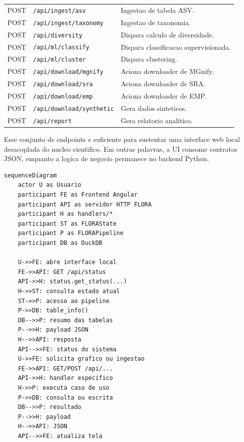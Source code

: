 \documentclass[12pt,a4paper]{article}
\begin{document}
\begin{longtable}{>{\raggedright\arraybackslash}p{2.2cm} >{\raggedright\arraybackslash}p{4.2cm} >{\raggedright\arraybackslash}p{7.4cm}}
    POST & \texttt{/api/ingest/asv} & Ingestao de tabela ASV. \\
    POST & \texttt{/api/ingest/taxonomy} & Ingestao de taxonomia. \\
    POST & \texttt{/api/diversity} & Dispara calculo de diversidade. \\
    POST & \texttt{/api/ml/classify} & Dispara classificacao supervisionada. \\
    POST & \texttt{/api/ml/cluster} & Dispara clustering. \\
    POST & \texttt{/api/download/mgnify} & Aciona downloader de MGnify. \\
    POST & \texttt{/api/download/sra} & Aciona downloader de SRA. \\
    POST & \texttt{/api/download/emp} & Aciona downloader de EMP. \\
    POST & \texttt{/api/download/synthetic} & Gera dados sinteticos. \\
    POST & \texttt{/api/report} & Gera relatorio analitico. \\
    \bottomrule
\end{longtable}

Esse conjunto de endpoints e suficiente para sustentar uma interface web local desacoplada do nucleo cientifico. Em outras palavras, a UI consome contratos JSON, enquanto a logica de negocio permanece no backend Python.

\begin{lstlisting}[style=mermaid,caption={Diagrama Mermaid da interacao entre frontend SPA e backend local.},label={lst:mermaid_ui_backend}]
sequenceDiagram
    actor U as Usuario
    participant FE as Frontend Angular
    participant API as servidor HTTP FLORA
    participant H as handlers/*
    participant ST as FLORAState
    participant P as FLORAPipeline
    participant DB as DuckDB

    U->>FE: abre interface local
    FE->>API: GET /api/status
    API->>H: status.get_status(...)
    H->>ST: consulta estado atual
    ST->>P: acesso ao pipeline
    P->>DB: table_info()
    DB-->>P: resumo das tabelas
    P-->>H: payload JSON
    H-->>API: resposta
    API-->>FE: status do sistema
    U->>FE: solicita grafico ou ingestao
    FE->>API: GET/POST /api/...
    API->>H: handler especifico
    H->>P: executa caso de uso
    P->>DB: consulta ou escrita
    DB-->>P: resultado
    P-->>H: payload
    H-->>API: JSON
    API-->>FE: atualiza tela
\end{lstlisting}
\end{document}
